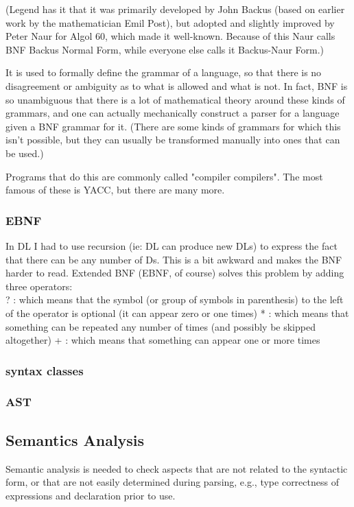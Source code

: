 (Legend has it that it was primarily developed by John Backus (based on earlier work by the mathematician Emil Post), but adopted and slightly improved by Peter Naur for Algol 60, which made it well-known. Because of this Naur calls BNF Backus Normal Form, while everyone else calls it Backus-Naur Form.)

It is used to formally define the grammar of a language, so that there is no disagreement or ambiguity as to what is allowed and what is not. In fact, BNF is so unambiguous that there is a lot of mathematical theory around these kinds of grammars, and one can actually mechanically construct a parser for a language given a BNF grammar for it. (There are some kinds of grammars for which this isn't possible, but they can usually be transformed manually into ones that can be used.)

Programs that do this are commonly called "compiler compilers". The most famous of these is YACC, but there are many more.



\subsubsection{EBNF}

In DL I had to use recursion (ie: DL can produce new DLs) to express the fact that there can be any number of Ds. This is a bit awkward and makes the BNF harder to read. Extended BNF (EBNF, of course) solves this problem by adding three operators:\\

    ? : which means that the symbol (or group of symbols in parenthesis) to the left of the operator is optional (it can appear zero or one times)
    * : which means that something can be repeated any number of times (and possibly be skipped altogether)
    + : which means that something can appear one or more times



\subsubsection{syntax classes}

\subsubsection{AST}


\subsection{Semantics Analysis}
Semantic analysis is needed to check aspects that are not related to the syntactic form, or that are not easily determined during parsing, e.g., type correctness of expressions and declaration prior to use.

